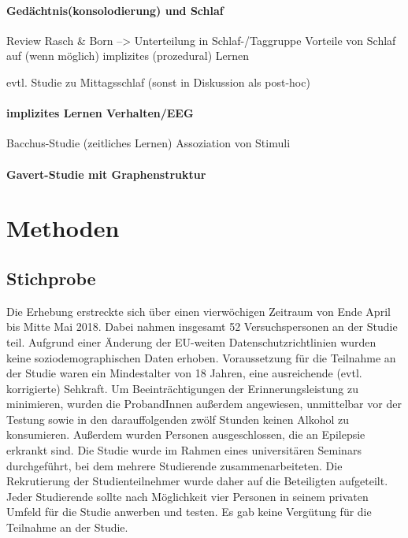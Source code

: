 \paragraph{Gedächtnis(konsolodierung) und Schlaf}
Review Rasch \& Born
--> Unterteilung in Schlaf-/Taggruppe
Vorteile von Schlaf auf (wenn möglich) implizites (prozedural) Lernen

evtl. Studie zu Mittagsschlaf (sonst in Diskussion als post-hoc)

\paragraph{implizites Lernen Verhalten/EEG}
Bacchus-Studie (zeitliches Lernen)
Assoziation von Stimuli

\paragraph{Gavert-Studie mit Graphenstruktur}

\section{Methoden}
\label{S:2}

\subsection{Stichprobe}
Die Erhebung erstreckte sich über einen vierwöchigen Zeitraum von Ende April bis Mitte Mai 2018. Dabei nahmen insgesamt 52 Versuchspersonen an der Studie teil. Aufgrund einer Änderung der  EU-weiten Datenschutzrichtlinien wurden keine soziodemographischen Daten erhoben. Voraussetzung für die Teilnahme an der Studie waren ein Mindestalter von 18 Jahren, eine ausreichende (evtl. korrigierte) Sehkraft. Um Beeinträchtigungen der Erinnerungsleistung zu minimieren, wurden die ProbandInnen außerdem angewiesen, unmittelbar vor der Testung sowie in den darauffolgenden zwölf Stunden keinen Alkohol zu konsumieren. Außerdem wurden Personen ausgeschlossen, die an Epilepsie erkrankt sind.
Die Studie wurde im Rahmen eines universitären Seminars durchgeführt, bei dem mehrere Studierende zusammenarbeiteten. Die Rekrutierung der Studienteilnehmer wurde daher auf die Beteiligten aufgeteilt. Jeder Studierende sollte nach Möglichkeit vier Personen in seinem privaten Umfeld für die Studie anwerben und testen. Es gab keine Vergütung für die Teilnahme an der Studie.

